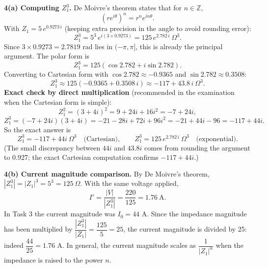 \documentclass[11pt]{article}
\begin{document}
\begin{exoresolu}
\textbf{4(a) Computing $Z_1^3$.}
De Moivre's theorem states that for $n \in \mathbb{Z}$,
\[
\left(r e^{i\theta}\right)^n = r^n e^{in\theta}.
\]
With $Z_1 = 5\, e^{0.9273\, i}$ (keeping extra precision in the angle to avoid rounding error):
\[
Z_1^3 = 5^3\, e^{i(3 \times 0.9273)} = 125\, e^{2.782\, i}\ \Omega^3.
\]
Since $3 \times 0.9273 = 2.7819$ rad lies in $(-\pi, \pi]$, this is already the principal argument. The polar form is
\[
Z_1^3 = 125\left(\cos 2.782 + i\sin 2.782\right).
\]
Converting to Cartesian form with $\cos 2.782 \approx -0.9365$ and $\sin 2.782 \approx 0.3508$:
\[
Z_1^3 \approx 125(-0.9365 + 0.3508\, i) \approx -117 + 43.8\, i\ \Omega^3.
\]
\textbf{Exact check by direct multiplication} (recommended in the examination when the Cartesian form is simple):
\[
Z_1^2 = (3+4i)^2 = 9 + 24i + 16i^2 = -7 + 24i,
\]
\[
Z_1^3 = (-7+24i)(3+4i) = -21 - 28i + 72i + 96i^2 = -21 + 44i - 96 = -117 + 44i.
\]
So the exact answer is
\[
Z_1^3 = -117 + 44i\ \Omega^3 \quad \text{(Cartesian)}, \qquad Z_1^3 = 125\, e^{2.782\, i}\ \Omega^3 \quad \text{(exponential)}.
\]
(The small discrepancy between $44i$ and $43.8i$ comes from rounding the argument to 0.927; the exact Cartesian computation confirms $-117 + 44i$.)

\textbf{4(b) Current magnitude comparison.}
By De Moivre's theorem, $|Z_1^3| = |Z_1|^3 = 5^3 = 125\ \Omega$. With the same voltage applied,
\[
I' = \frac{|V|}{|Z_1^3|} = \frac{220}{125} = 1.76\ \text{A}.
\]
In Task 3 the current magnitude was $I_0 = 44$ A. Since the impedance magnitude has been multiplied by $\dfrac{|Z_1^3|}{|Z_1|} = \dfrac{125}{5} = 25$, the current magnitude is divided by 25: indeed $\dfrac{44}{25} = 1.76$ A. In general, the current magnitude scales as $\dfrac{1}{|Z_1|^n}$ when the impedance is raised to the power $n$.
\end{exoresolu}
\end{document}

